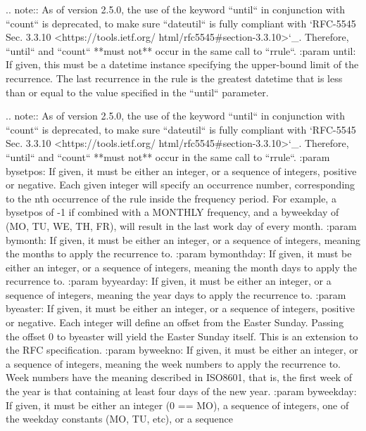 \begin{DoxyVerb}
    .. note::
        As of version 2.5.0, the use of the keyword ``until`` in conjunction
        with ``count`` is deprecated, to make sure ``dateutil`` is fully
        compliant with `RFC-5545 Sec. 3.3.10 <https://tools.ietf.org/
        html/rfc5545#section-3.3.10>`_. Therefore, ``until`` and ``count``
        **must not** occur in the same call to ``rrule``.
:param until:
    If given, this must be a datetime instance specifying the upper-bound
    limit of the recurrence. The last recurrence in the rule is the greatest
    datetime that is less than or equal to the value specified in the
    ``until`` parameter.

    .. note::
        As of version 2.5.0, the use of the keyword ``until`` in conjunction
        with ``count`` is deprecated, to make sure ``dateutil`` is fully
        compliant with `RFC-5545 Sec. 3.3.10 <https://tools.ietf.org/
        html/rfc5545#section-3.3.10>`_. Therefore, ``until`` and ``count``
        **must not** occur in the same call to ``rrule``.
:param bysetpos:
    If given, it must be either an integer, or a sequence of integers,
    positive or negative. Each given integer will specify an occurrence
    number, corresponding to the nth occurrence of the rule inside the
    frequency period. For example, a bysetpos of -1 if combined with a
    MONTHLY frequency, and a byweekday of (MO, TU, WE, TH, FR), will
    result in the last work day of every month.
:param bymonth:
    If given, it must be either an integer, or a sequence of integers,
    meaning the months to apply the recurrence to.
:param bymonthday:
    If given, it must be either an integer, or a sequence of integers,
    meaning the month days to apply the recurrence to.
:param byyearday:
    If given, it must be either an integer, or a sequence of integers,
    meaning the year days to apply the recurrence to.
:param byeaster:
    If given, it must be either an integer, or a sequence of integers,
    positive or negative. Each integer will define an offset from the
    Easter Sunday. Passing the offset 0 to byeaster will yield the Easter
    Sunday itself. This is an extension to the RFC specification.
:param byweekno:
    If given, it must be either an integer, or a sequence of integers,
    meaning the week numbers to apply the recurrence to. Week numbers
    have the meaning described in ISO8601, that is, the first week of
    the year is that containing at least four days of the new year.
:param byweekday:
    If given, it must be either an integer (0 == MO), a sequence of
    integers, one of the weekday constants (MO, TU, etc), or a sequence

\end{DoxyVerb}
